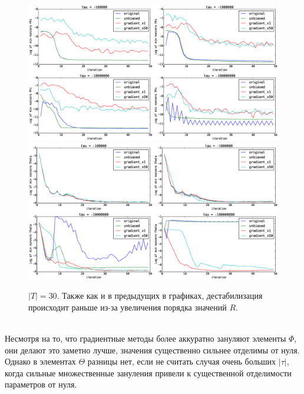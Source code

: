 \documentclass[12pt]{article}
\begin{document}
\begin{figure}[H]
	\centering
	\caption{$|T| = 30$. Также как и в предыдущих в графиках, дестабилизация происходит раньше из-за увеличения порядка значений $R$.}    
	\includegraphics[width=1.0\linewidth]{pictures/topics_30_minPhi_values}
	\includegraphics[width=1.0\linewidth]{pictures/topics_30_minTheta_values}
\end{figure}
\ \\
Несмотря на то, что градиентные методы более аккуратно  зануляют элементы $\Phi$, они делают это заметно лучше, значения существенно сильнее отделимы от нуля. Однако в элементах $\Theta$ разницы нет, если не считать случая очень больших $|\tau|$, когда сильные множественные зануления привели к существенной отделимости параметров от нуля.
\end{document}
